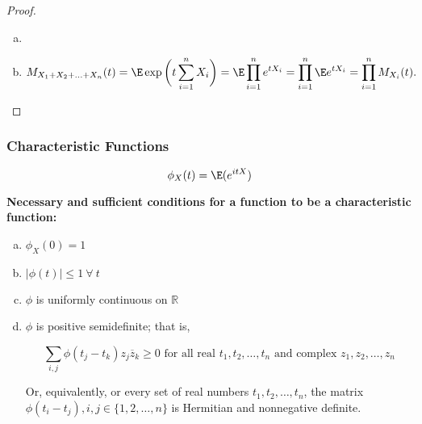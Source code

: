 \begin{proof}

\begin{enumerate}[(a)]

\item

\item 

\[
M_{X_1 + X_2 + \ldots + X_n}(t)  = \E \exp \bigg(t \sum_{i=1}^n X_i \bigg) =  \E \prod_{i=1}^n e^{tX_i} =\prod_{i=1}^n   \E e^{tX_i} = \prod_{i=1}^n M_{X_i}(t).
\]

\end{enumerate}
\end{proof}

\subsubsection{Characteristic Functions}

\begin{definition}

\[
\phi_X(t) = \E(e^{itX}) 
\]

\end{definition}

\begin{proposition} \textbf{Necessary and sufficient conditions for a function to be a characteristic function:}

\begin{enumerate}[(a)]

\item \(\phi_X(0) = 1\)

\item \(\left| \phi(t)\right| \leq 1 \ \forall \ t\)

\item \(\phi\) is uniformly continuous on \(\mathbb{R}\)

\item \(\phi\) is positive semidefinite; that is,

\[
\sum_{i, j} \phi(t_j - t_k)z_j \overline{z}_k \geq 0 \text{ for all real } t_1, t_2, \ldots, t_n \text{ and complex } z_1, z_2, \ldots, z_n
\]

Or, equivalently, or every set of real numbers \(t_1, t_2, \ldots, t_n\), the matrix \(\phi(t_i - t_j), i, j \in \{1, 2, \ldots, n\}\) is Hermitian and nonnegative definite.

\end{enumerate}
\end{proposition}

